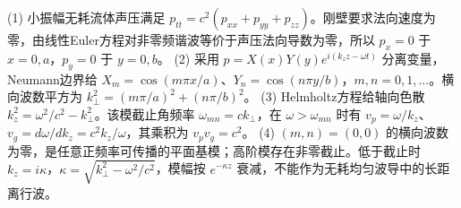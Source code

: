 (1) 小振幅无耗流体声压满足 \(p_{tt}=c^2(p_{xx}+p_{yy}+p_{zz})\)。刚壁要求法向速度为零，由线性Euler方程对非零频谐波等价于声压法向导数为零，所以 \(p_x=0\) 于 \(x=0,a\)，\(p_y=0\) 于 \(y=0,b\)。
(2) 采用 \(p=X(x)Y(y)e^{i(k_z z-\omega t)}\) 分离变量，Neumann边界给 \(X_m=\cos(m\pi x/a)\)、\(Y_n=\cos(n\pi y/b)\)，\(m,n=0,1,\ldots\)。横向波数平方为 \(k_\perp^2=(m\pi/a)^2+(n\pi/b)^2\)。
(3) Helmholtz方程给轴向色散 \(k_z^2=\omega^2/c^2-k_\perp^2\)。该模截止角频率 \(\omega_{mn}=ck_\perp\)，在 \(\omega>\omega_{mn}\) 时有 \(v_p=\omega/k_z\)、\(v_g=d\omega/dk_z=c^2k_z/\omega\)，其乘积为 \(v_pv_g=c^2\)。
(4) \((m,n)=(0,0)\) 的横向波数为零，是任意正频率可传播的平面基模；高阶模存在非零截止。低于截止时 \(k_z=i\kappa\)，\(\kappa=\sqrt{k_\perp^2-\omega^2/c^2}\)，模幅按 \(e^{-\kappa z}\) 衰减，不能作为无耗均匀波导中的长距离行波。
